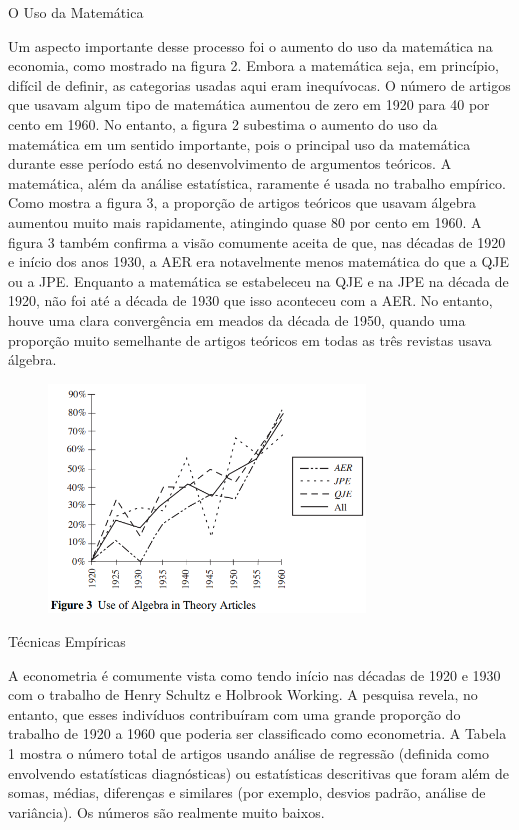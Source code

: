 \documentclass[12pt]{article}
\begin{document}
O Uso da Matemática

Um aspecto importante desse processo foi o aumento do uso da matemática na economia, como mostrado na figura 2. Embora a matemática seja, em princípio, difícil de definir, as categorias usadas aqui eram inequívocas. O número de artigos que usavam algum tipo de matemática aumentou de zero em 1920 para 40 por cento em 1960. No entanto, a figura 2 subestima o aumento do uso da matemática em um sentido importante, pois o principal uso da matemática durante esse período está no desenvolvimento de argumentos teóricos. A matemática, além da análise estatística, raramente é usada no trabalho empírico. Como mostra a figura 3, a proporção de artigos teóricos que usavam álgebra aumentou muito mais rapidamente, atingindo quase 80 por cento em 1960. A figura 3 também confirma a visão comumente aceita de que, nas décadas de 1920 e início dos anos 1930, a AER era notavelmente menos matemática do que a QJE ou a JPE. Enquanto a matemática se estabeleceu na QJE e na JPE na década de 1920, não foi até a década de 1930 que isso aconteceu com a AER. No entanto, houve uma clara convergência em meados da década de 1950, quando uma proporção muito semelhante de artigos teóricos em todas as três revistas usava álgebra.

 \begin{figure}[H]
    \centering
    \includegraphics[width=0.75\textwidth]{figure 3.png}
    \end{figure}

Técnicas Empíricas

A econometria é comumente vista como tendo início nas décadas de 1920 e 1930 com o trabalho de Henry Schultz e Holbrook Working. A pesquisa revela, no entanto, que esses indivíduos contribuíram com uma grande proporção do trabalho de 1920 a 1960 que poderia ser classificado como econometria. A Tabela 1 mostra o número total de artigos usando análise de regressão (definida como envolvendo estatísticas diagnósticas) ou estatísticas descritivas que foram além de somas, médias, diferenças e similares (por exemplo, desvios padrão, análise de variância). Os números são realmente muito baixos.
\end{document}
